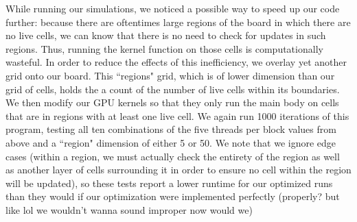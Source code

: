 \documentclass[12pt]{article}
\begin{document}
    While running our simulations, we noticed a possible way to speed up our code further: because there are oftentimes large regions of the board in which there are no live cells, we can know that there is no need to check for updates in such regions. Thus, running the kernel function on those cells is computationally wasteful. In order to reduce the effects of this inefficiency, we overlay yet another grid onto our board. This ``regions" grid, which is of lower dimension than our grid of cells, holds the a count of the number of live cells within its boundaries. We then modify our GPU kernels so that they only run the main body on cells that are in regions with at least one live cell. We again run 1000 iterations of this program, testing all ten combinations of the five threads per block values from above and a ``region" dimension of either 5 or 50. We note that we ignore edge cases (within a region, we must actually check the entirety of the region as well as another layer of cells surrounding it in order to ensure no cell within the region will be updated), so these tests report a lower runtime for our optimized runs than they would if our optimization were implemented perfectly (properly? but like lol we wouldn't wanna sound improper now would we)
\end{document}

